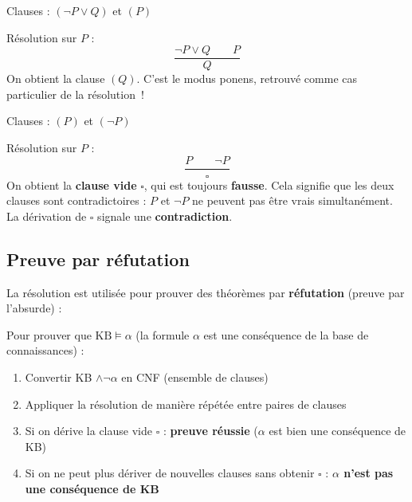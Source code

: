 \documentclass[11pt,a4paper]{article}
\begin{document}
\begin{exemplebox}
Clauses : $(\neg P \lor Q)$ et $(P)$

Résolution sur $P$ :
$$\frac{\neg P \lor Q \quad\quad P}{Q}$$
On obtient la clause $(Q)$. C'est le modus ponens, retrouvé comme cas particulier de la résolution~!
\end{exemplebox}

\begin{exemplebox}
Clauses : $(P)$ et $(\neg P)$

Résolution sur $P$ :
$$\frac{P \quad\quad \neg P}{\square}$$
On obtient la \textbf{clause vide} $\square$, qui est toujours \textbf{fausse}. Cela signifie que les deux clauses sont contradictoires : $P$ et $\neg P$ ne peuvent pas être vrais simultanément. La dérivation de $\square$ signale une \textbf{contradiction}.
\end{exemplebox}

\subsection{Preuve par réfutation}

La résolution est utilisée pour prouver des théorèmes par \textbf{réfutation} (preuve par l'absurde) :

\begin{recipebox}
Pour prouver que $\text{KB} \models \alpha$ (la formule $\alpha$ est une conséquence de la base de connaissances) :
\begin{enumerate}
    \item Convertir KB $\land \neg\alpha$ en CNF (ensemble de clauses)
    \item Appliquer la résolution de manière répétée entre paires de clauses
    \item Si on dérive la clause vide $\square$ : \textbf{preuve réussie} ($\alpha$ est bien une conséquence de KB)
    \item Si on ne peut plus dériver de nouvelles clauses sans obtenir $\square$ : \textbf{$\alpha$ n'est pas une conséquence de KB}
\end{enumerate}
\end{recipebox}
\end{document}
